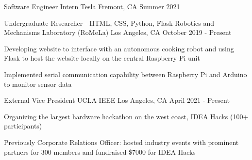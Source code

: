 \documentclass[12pt, letterpaper]{awesome-cv}
\begin{document}
\begin{cventries}
  \cventry
    {Software Engineer Intern} %
    {Tesla} %
    {Fremont, CA} %
    {Summer 2021} %
    {
    }
  \vspace{-0.07in}

  \cventry
    {Undergraduate Researcher - HTML, CSS, Python, Flask} %
    {Robotics and Mechanisms Laboratory (RoMeLa)} %
    {Los Angeles, CA} %
    {October 2019 - Present} %
    {
      \begin{cvitems} %
        \item {Developing website to interface with an autonomous cooking robot and using Flask to host the website locally on the central Raspberry Pi unit}
        \item {Implemented serial communication capability between Raspberry Pi and Arduino to monitor sensor data}
      \end{cvitems}
    }

\end{cventries}


\begin{cventries}
  \cventry
    {External Vice President} %
    {UCLA IEEE} %
    {Los Angeles, CA} %
    {April 2021 - Present} %
    {
      \begin{cvitems} %
        \item {Organizing the largest hardware hackathon on the west coast, IDEA Hacks (100+ participants)}
        \item {Previously Corporate Relations Officer: hosted industry events with prominent partners for 300 members and fundraised \$7000 for IDEA Hacks}
      \end{cvitems}
    }
\end{cventries}
\end{document}
